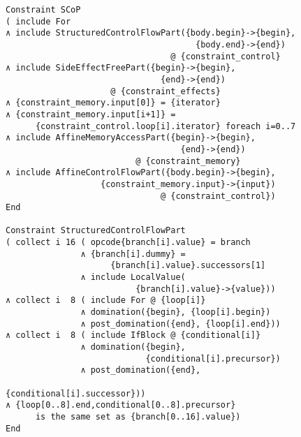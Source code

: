 \begin{figure}[h]
\begin{lstlisting}[language=CAnDL,basicstyle=\linespread{0.8}\small\ttfamily,
                   captionpos=t,caption=
   {Constraint specification in CAnDL of Scalar Control Parts (SCoPs):
    These regular loop nests enable polyhedral transformations to be applied,
    due to their structured control flow, side effect free function calls and
    the well-behaved memory access that is affine in loop iterators.
    The involved CAnDL code is displayed, including relevant parts of the CAnDL
    standard library.
    \parfillskip=0pt}]
Constraint SCoP
( include For
∧ include StructuredControlFlowPart({body.begin}->{begin},
                                      {body.end}->{end})
                                 @ {constraint_control}
∧ include SideEffectFreePart({begin}->{begin},
                               {end}->{end})
                     @ {constraint_effects}
∧ {constraint_memory.input[0]} = {iterator}
∧ {constraint_memory.input[i+1]} =
      {constraint_control.loop[i].iterator} foreach i=0..7
∧ include AffineMemoryAccessPart({begin}->{begin},
                                   {end}->{end})
                          @ {constraint_memory}
∧ include AffineControlFlowPart({body.begin}->{begin},
                   {constraint_memory.input}->{input})
                               @ {constraint_control})
End

Constraint StructuredControlFlowPart
( collect i 16 ( opcode{branch[i].value} = branch
               ∧ {branch[i].dummy} =
                     {branch[i].value}.successors[1]
               ∧ include LocalValue(
                          {branch[i].value}->{value}))
∧ collect i  8 ( include For @ {loop[i]}
               ∧ domination({begin}, {loop[i].begin})
               ∧ post_domination({end}, {loop[i].end}))
∧ collect i  8 ( include IfBlock @ {conditional[i]}
               ∧ domination({begin},
                            {conditional[i].precursor})
               ∧ post_domination({end},
                                 {conditional[i].successor}))
∧ {loop[0..8].end,conditional[0..8].precursor}
      is the same set as {branch[0..16].value})
End
\end{lstlisting}
\end{figure}
